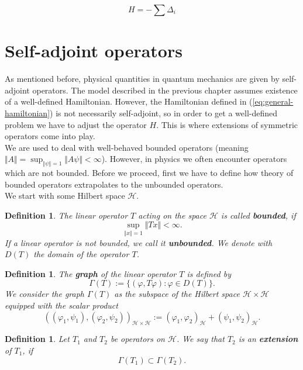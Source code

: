\documentclass[11pt, a4paper, german]{article}
\newtheorem{definition}[theorem]{Definition}
\numberwithin{equation}{section}
\numberwithin{theorem}{section}
\begin{document}
\begin{equation} \label{eq:general-hamiltonian}
H = -\sum\Delta_i
\end{equation}

\section{Self-adjoint operators}

As mentioned before, physical quantities in quantum mechanics are given by self-adjoint operators. The model described in the previous chapter assumes existence of a well-defined Hamiltonian. However, the Hamiltonian defined in (\ref{eq:general-hamiltonian}) is not necessarily self-adjoint, so in order to get a well-defined problem we have to adjust the operator $H$. This is where extensions of symmetric operators come into play.\\

We are used to deal with well-behaved bounded operators (meaning $\Vert A\Vert = \sup_{\Vert \psi \Vert = 1} \Vert A \psi \Vert < \infty$). However, in physics we often encounter operators which are not bounded. Before we proceed, first we have to define how theory of bounded operators extrapolates to the unbounded operators. \\

We start with some Hilbert space $\mathcal{H}$.

\begin{definition} The linear operator $T$ acting on the space $\mathcal{H}$ is called \textbf{bounded}, if $$\sup_{\Vert x \Vert = 1}  \Vert Tx \Vert < \infty.$$ If a linear operator is not bounded, we call it \textbf{unbounded}. We denote with $D(T)$ the domain of the operator $T$.
\end{definition}

\begin{definition}
The \textbf{graph} of the linear operator $T$ is defined by $$\Gamma(T) := \{(\varphi, T\varphi): \varphi \in D(T)\}.$$ We consider the graph $\Gamma(T)$ as the subspace of the Hilbert space $\mathcal{H}\times \mathcal{H}$ equipped with the scalar product $$((\varphi_1, \psi_1), (\varphi_2, \psi_2))_{\mathcal{H}\times\mathcal{H}} := (\varphi_1, \varphi_2)_{\mathcal{H}} + (\psi_1, \psi_2)_{\mathcal{H}}.$$
\end{definition}

\begin{definition}
Let $T_1$ and $T_2$ be operators on $\mathcal{H}$. We say that $T_2$ is an \textbf{extension} of $T_1$, if $$\Gamma(T_1) \subset \Gamma(T_2).$$
\end{definition}
\end{document}
